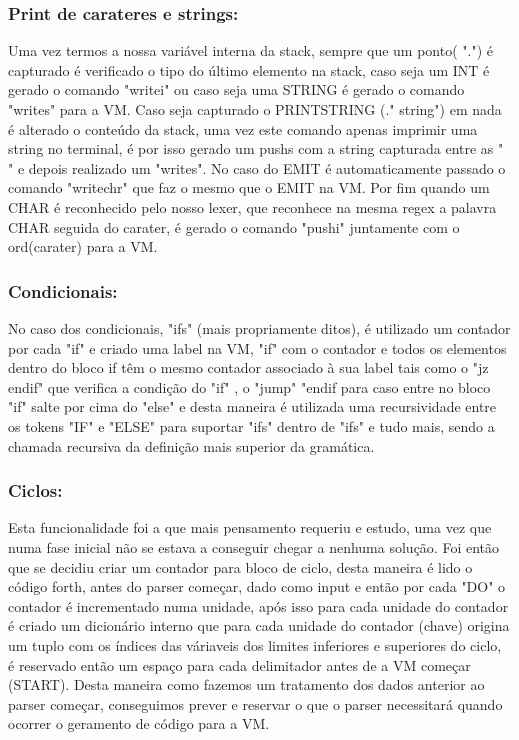 \documentclass{article}
\begin{document}
\subsubsection*{Print de carateres e strings:}
    \vspace{0.5cm}
    Uma vez termos a nossa variável interna da stack, sempre que um ponto( ".") é capturado é verificado o tipo do último elemento na stack, caso seja um INT é gerado o comando "writei" ou caso seja uma STRING é gerado o comando "writes" para a VM. Caso seja capturado o  PRINTSTRING (." string")
    em nada é alterado o conteúdo da stack, uma vez este comando apenas imprimir uma string no terminal, é por isso gerado um pushs com a string capturada entre as " " e depois realizado um "writes".
    No caso do EMIT é automaticamente passado o comando "writechr" que faz o mesmo que o EMIT na VM. 
    Por fim quando um CHAR é reconhecido pelo nosso lexer, que reconhece na mesma regex a palavra CHAR seguida do carater, é gerado o comando "pushi" juntamente com o ord(carater) para a VM.
    \vspace{1cm}

\subsubsection*{Condicionais:}
    \vspace{0.5cm}

    No caso dos condicionais, "ifs" (mais propriamente ditos), é utilizado um contador por cada "if" e criado uma label na VM, "if" com o contador e todos os elementos dentro do bloco if têm o mesmo contador associado à sua label tais como o "jz endif" que verifica a condição do "if" , o "jump" "endif para caso entre no bloco "if" salte por cima do "else" e desta maneira é utilizada uma recursividade entre os tokens "IF" e "ELSE" para suportar "ifs" dentro de "ifs" e tudo mais, sendo a chamada recursiva da definição mais superior da gramática.
   
    \vspace{1cm}

\subsubsection*{Ciclos:}
    \vspace{0.5cm}

    Esta funcionalidade foi a que mais pensamento requeriu e estudo, uma vez que numa fase inicial não se estava a conseguir chegar a nenhuma solução.
    Foi então que se decidiu criar um contador para bloco de ciclo, desta maneira é lido o código forth, antes do parser começar, dado como input e então por cada "DO" o contador é incrementado numa unidade, após isso para cada unidade do contador é criado um dicionário interno que para cada unidade do contador (chave) origina um tuplo com os índices das váriaveis dos limites inferiores e superiores do ciclo, é reservado então um espaço para cada delimitador antes de a VM começar (START).
    Desta maneira como fazemos um tratamento dos dados anterior ao parser começar, conseguimos prever e reservar o que o parser necessitará quando ocorrer o geramento de código para a VM.
\end{document}
